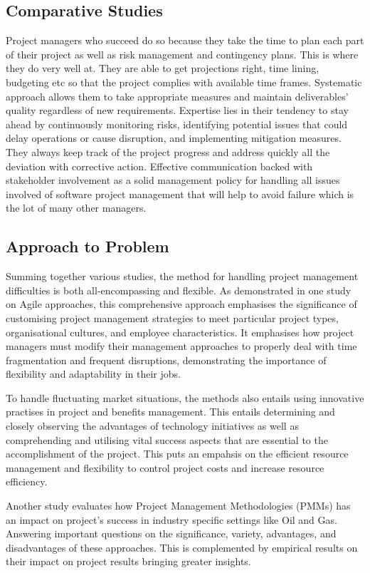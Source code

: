 \documentclass{article}
\begin{document}
\subsection{Comparative Studies}
Project managers who succeed do so because they take the time to plan each part of their project as well as risk management and contingency plans. This is where they do very well at. They are able to get projections right, time lining, budgeting etc so that the project complies with available time frames. Systematic approach allows them to take appropriate measures and maintain deliverables’ quality regardless of new requirements. Expertise lies in their tendency to stay ahead by continuously monitoring risks, identifying potential issues that could delay operations or cause disruption, and implementing mitigation measures. They always keep track of the project progress and address quickly all the deviation with corrective action. Effective communication backed with stakeholder involvement as a solid management policy for handling all issues involved of software project management that will help to avoid failure which is the lot of many other managers.\cite{jones2004software}


\subsection{Approach to Problem}
Summing together various studies, the method for handling project management difficulties is both all-encompassing and flexible. As demonstrated in one study on Agile approaches, this comprehensive approach emphasises the significance of customising project management strategies to meet particular project types, organisational cultures, and employee characteristics. It emphasises how project managers must modify their management approaches to properly deal with time fragmentation and frequent disruptions, demonstrating the importance of flexibility and adaptability in their jobs.

To handle fluctuating market situations, the methods also entails using innovative practises in project and benefits management. This entails determining and closely observing the advantages of technology initiatives as well as comprehending and utilising vital success aspects that are essential to the accomplishment of the project. This puts an empahsis on the efficient resource management and flexibility to control project costs and increase resource efficiency.

Another study evaluates how Project Management Methodologies (PMMs)
has an impact on project's success in industry specific settings like Oil and Gas. Answering important questions on the significance, variety, advantages, and disadvantages of these approaches. This is complemented by empirical results on their impact on project results bringing greater insights.
\end{document}
